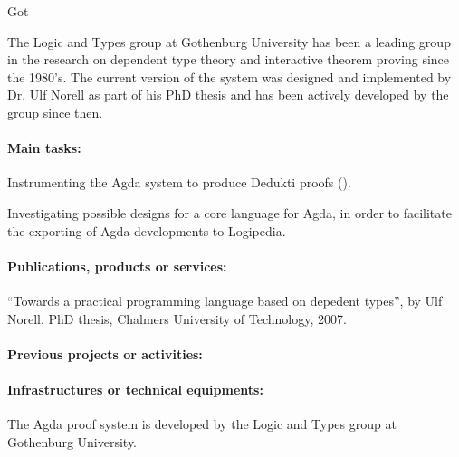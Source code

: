 \begin{sitedescription}{Got}


The Logic and Types group at Gothenburg University has been a leading group
in the research on dependent type theory and interactive theorem proving
since the 1980's. The current version of the system was designed and
implemented by Dr. Ulf Norell as part of his PhD thesis and has been
actively developed by the group since then.

\paragraph*{Main tasks:}

\begin{compactitem}
\item Instrumenting the Agda system to produce Dedukti proofs
  ().
\item Investigating possible designs for a core language for Agda, in
  order to facilitate the exporting of Agda developments to Logipedia.
\end{compactitem}

\paragraph*{Publications, products or services:}
\begin{compactitem}
  \item ``Towards a practical programming language based on
  depedent types'', by Ulf Norell. PhD thesis, Chalmers University of Technology, 2007.
\end{compactitem}

\paragraph*{Previous projects or activities:}

\paragraph*{Infrastructures or technical equipments:}
\begin{compactitem}
\item The Agda proof system is developed by the Logic and Types group at
Gothenburg University.
\end{compactitem}


\end{sitedescription}
